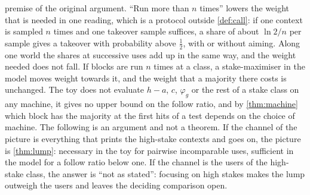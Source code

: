 premise of the original argument. ``Run more than $n$ times'' lowers the weight that is needed in one
reading, which is a protocol outside \cref{def:call}: if one context is sampled $n$ times and one takeover
sample suffices, a share of about $\ln2/n$ per sample gives a takeover with probability above $\frac12$, with
or without aiming. Along one world the shares at successive uses add up in the same way, and the weight
needed does not fall. If blocks are run $n$ times at a class, a stake-maximiser
in the model moves weight towards it, and the weight that a majority there costs is unchanged. The toy does
not evaluate $h-a$, $c$, $\varphi_g$ or the rest of a stake class on any machine, it gives no upper bound on
the follow ratio, and by \cref{thm:machine} which block has the majority at the first hits of a test depends
on the choice of machine. The following is an argument and not a theorem. If the channel of the picture is
everything that prints the high-stake contexts and goes on, the picture is \cref{thm:lump}: necessary in the
toy for pairwise incomparable uses, sufficient in the model for a follow ratio below one. If the channel is
the users of the high-stake class, the answer is ``not as
stated'': focusing on high stakes makes the lump outweigh the users and leaves the deciding comparison open.
